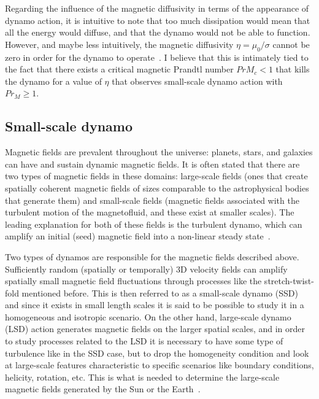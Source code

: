 \documentclass[a4paper,12pt]{article}
\begin{document}
Regarding the influence of the magnetic diffusivity in terms of the appearance of dynamo action, it is intuitive to note that too much dissipation would mean that all the energy would diffuse, and that the dynamo would not be able to function. However, and maybe less intuitively, the magnetic diffusivity $\eta = \mu_0/\sigma$ cannot be zero in order for the dynamo to operate~\cite{schnack2009lectures}. I believe that this is intimately tied to the fact that there exists a critical magnetic Prandtl number $PrM_c < 1$ that kills the dynamo for a value of $\eta$ that observes small-scale dynamo action with $Pr_M \geq 1$.

\subsection{Small-scale dynamo}

Magnetic fields are prevalent throughout the universe: planets, stars, and galaxies can have and sustain dynamic magnetic fields. It is often stated that there are two types of magnetic fields in these domains: large-scale fields (ones that create spatially coherent magnetic fields of sizes comparable to the astrophysical bodies that generate them) and small-scale fields (magnetic fields associated with the turbulent motion of the magnetofluid, and these exist at smaller scales). The leading explanation for both of these fields is the turbulent dynamo, which can amplify an initial (seed) magnetic field into a non-linear steady state~\cite{schekochihin2004simulations}.

Two types of dynamos are responsible for the magnetic fields described above. Sufficiently random (spatially or temporally) 3D velocity fields can amplify spatially small magnetic field fluctuations through processes like the stretch-twist-fold mentioned before. This is then referred to as a small-scale dynamo (SSD) and since it exists in small length scales it is said to be possible to study it in a homogeneous and isotropic scenario. On the other hand, large-scale dynamo (LSD) action generates magnetic fields on the larger spatial scales, and in order to study processes related to the LSD it is necessary to have some type of turbulence like in the SSD case, but to drop the homogeneity condition and look at large-scale features characteristic to specific scenarios like boundary conditions, helicity, rotation, etc. This is what is needed to determine the large-scale magnetic fields generated by the Sun or the Earth~\cite{schekochihin2004simulations}.
\end{document}
